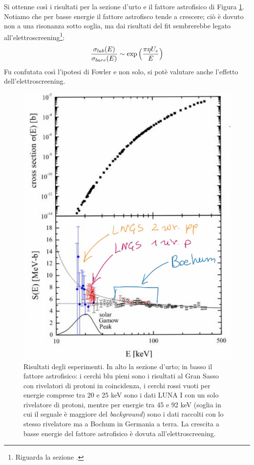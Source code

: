 \noindent Si ottenne così i risultati per la sezione d'urto e il fattore astrofisico di Figura \ref{0415_sigma}. Notiamo che per basse energie il fattore astrofisco tende a crescere; ciò è dovuto non a una risonanza sotto soglia, ma dai risultati del fit sembrerebbe legato all'elettroscreening\footnote{Riguarda la sezione .}:
$$\frac{\sigma_{lab} (E)}{\sigma_{bare} (E)} \sim \exp{\Bigl ( \frac{\pi\eta U_e}{E} \Bigr )}$$
Fu confutata così l'ipotesi di Fowler e non solo, si potè valutare anche l'effetto dell'elettroscreening.

\begin{figure}[!h]
	\centering
	\includegraphics[scale=0.5]{Immagini/0415_sigma.png}
	\caption{Risultati degli esperimenti. In alto la sezione d'urto; in basso il fattore astrofisico: i cerchi blu pieni sono i risultati al Gran Sasso con rivelatori di protoni in coincidenza, i cerchi rossi vuoti per energie comprese tra 20 e 25 keV sono i dati LUNA I con un solo rivelatore di protoni, mentre per energie tra 45 e 92 keV (soglia in cui il segnale è maggiore del \textit{background}) sono i dati raccolti con lo stesso rivelatore ma a Bochum in Germania a terra. La crescita a basse energie del fattore astrofisico è dovuta all'elettroscreening.}
	\label{0415_sigma}
\end{figure}

